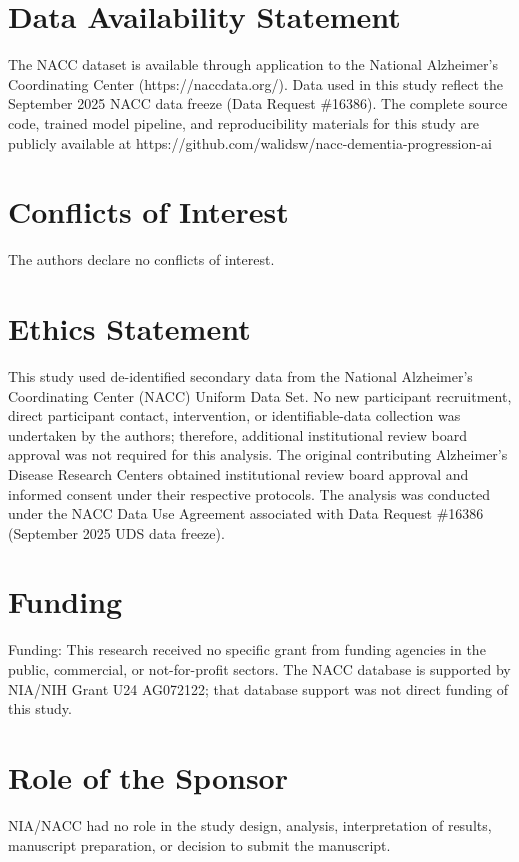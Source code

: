\documentclass[preprint,12pt]{elsarticle}
\begin{document}
\section*{Data Availability Statement}
The NACC dataset is available through application to the National Alzheimer's Coordinating Center (https://naccdata.org/). Data used in this study reflect the September 2025 NACC data freeze (Data Request \#16386). The complete source code, trained model pipeline, and reproducibility materials for this study are publicly available at https://github.com/walidsw/nacc-dementia-progression-ai

\section*{Conflicts of Interest}
The authors declare no conflicts of interest.

\section*{Ethics Statement}
This study used de-identified secondary data from the National Alzheimer's Coordinating Center (NACC) Uniform Data Set. No new participant recruitment, direct participant contact, intervention, or identifiable-data collection was undertaken by the authors; therefore, additional institutional review board approval was not required for this analysis. The original contributing Alzheimer's Disease Research Centers obtained institutional review board approval and informed consent under their respective protocols. The analysis was conducted under the NACC Data Use Agreement associated with Data Request \#16386 (September 2025 UDS data freeze).

\section*{Funding}
Funding: This research received no specific grant from funding agencies in the public, commercial, or not-for-profit sectors. The NACC database is supported by NIA/NIH Grant U24 AG072122; that database support was not direct funding of this study.

\section*{Role of the Sponsor}
NIA/NACC had no role in the study design, analysis, interpretation of results, manuscript preparation, or decision to submit the manuscript.
\end{document}
